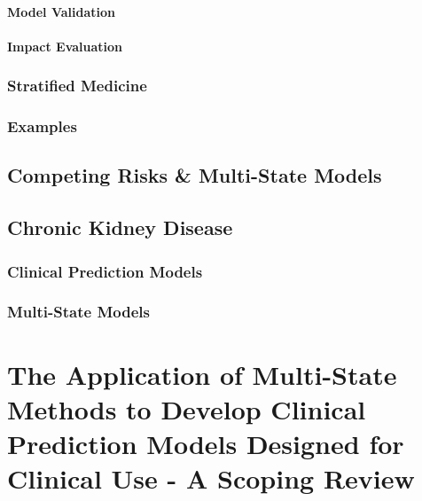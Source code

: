 \documentclass[12pt,PhD,twoside,openright]{muthesis}
\begin{document}
\hypertarget{model-validation}{%
\subsubsection{Model Validation}\label{model-validation}}

\hypertarget{impact-evaluation}{%
\subsubsection{Impact Evaluation}\label{impact-evaluation}}

\hypertarget{stratified-medicine}{%
\subsection{Stratified Medicine}\label{stratified-medicine}}

\hypertarget{examples}{%
\subsection{Examples}\label{examples}}

\hypertarget{competing-risks-multi-state-models}{%
\section{Competing Risks \& Multi-State Models}\label{competing-risks-multi-state-models}}

\hypertarget{chronic-kidney-disease}{%
\section{Chronic Kidney Disease}\label{chronic-kidney-disease}}

\hypertarget{clinical-prediction-models-1}{%
\subsection{Clinical Prediction Models}\label{clinical-prediction-models-1}}

\hypertarget{multi-state-models}{%
\subsection{Multi-State Models}\label{multi-state-models}}

\hypertarget{chap-scoping-review}{%
\chapter{The Application of Multi-State Methods to Develop Clinical Prediction Models Designed for Clinical Use - A Scoping Review}\label{chap-scoping-review}}
\end{document}

